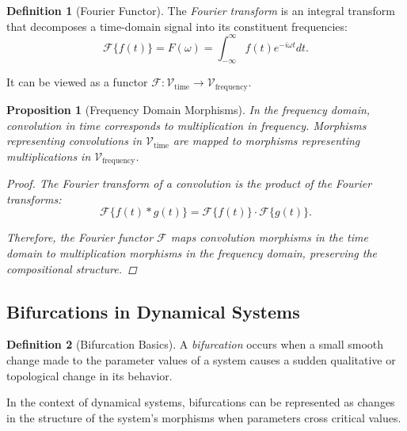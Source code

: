 \documentclass{article}
\newtheorem{proposition}{Proposition}[section]
\theoremstyle{definition}
\newtheorem{definition}{Definition}[section]
\theoremstyle{remark}
\begin{document}
	\begin{definition}[Fourier Functor]
		The \emph{Fourier transform} is an integral transform that decomposes a time-domain signal into its constituent frequencies:
		\[
		\mathcal{F}\{ f(t) \} = F(\omega) = \int_{-\infty}^{\infty} f(t) e^{-i \omega t} dt.
		\]
		
		It can be viewed as a functor $\mathcal{F}: \mathcal{V}_{\text{time}} \rightarrow \mathcal{V}_{\text{frequency}}$.
		
	\end{definition}
	
	\begin{proposition}[Frequency Domain Morphisms]
		In the frequency domain, convolution in time corresponds to multiplication in frequency. Morphisms representing convolutions in $\mathcal{V}_{\text{time}}$ are mapped to morphisms representing multiplications in $\mathcal{V}_{\text{frequency}}$.
		
		\begin{proof}
			The Fourier transform of a convolution is the product of the Fourier transforms:
			\[
			\mathcal{F}\{ f(t) * g(t) \} = \mathcal{F}\{ f(t) \} \cdot \mathcal{F}\{ g(t) \}.
			\]
			
			Therefore, the Fourier functor $\mathcal{F}$ maps convolution morphisms in the time domain to multiplication morphisms in the frequency domain, preserving the compositional structure.
		\end{proof}
	\end{proposition}
	
	\subsection{Bifurcations in Dynamical Systems}
	
	\begin{definition}[Bifurcation Basics]
		A \emph{bifurcation} occurs when a small smooth change made to the parameter values of a system causes a sudden qualitative or topological change in its behavior.
		
		In the context of dynamical systems, bifurcations can be represented as changes in the structure of the system's morphisms when parameters cross critical values.
	\end{definition}
	
\end{document}
